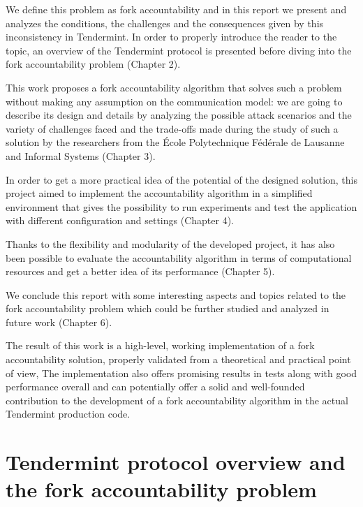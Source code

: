 \documentclass[a4paper,11pt,oneside]{report}
\begin{document}
We define this problem as fork accountability and in this report we present and analyzes the conditions, the challenges and the consequences given by this inconsistency in Tendermint. In order to properly introduce the reader to the topic, an overview of the Tendermint protocol is presented before diving into the fork accountability problem (Chapter 2). 

This work proposes a fork accountability algorithm that solves such a problem without making any assumption on the communication model: we are going to describe its design and details by analyzing the possible attack scenarios and the variety of challenges faced and the trade-offs made during the study of such a solution by the researchers from the École Polytechnique Fédérale de Lausanne and Informal Systems (Chapter 3). 

In order to get a more practical idea of the potential of the designed solution, this project aimed to implement the accountability algorithm in a simplified environment that gives the possibility to run experiments and test the application with different configuration and settings (Chapter 4). 

Thanks to the flexibility and modularity of the developed project, it has also been possible to evaluate the accountability algorithm in terms of computational resources and get a better idea of its performance (Chapter 5). 

We conclude this report with some interesting aspects and topics related to the fork accountability problem which could be further studied and analyzed in future work (Chapter 6). 

The result of this work is a high-level, working implementation of a fork accountability solution, properly validated from a theoretical and practical point of view, The implementation also offers promising results in tests along with good performance overall and can potentially offer a solid and well-founded contribution to the development of a fork accountability algorithm in the actual Tendermint production code.

\chapter{Tendermint protocol overview and the fork accountability problem}
\end{document}
